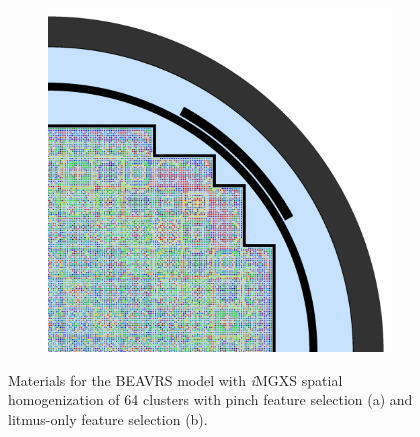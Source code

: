 \begin{figure}[h!]
\begin{subfigure}{0.67\textwidth}
  \includegraphics[width=\linewidth]{figures/unsupervised/geometries/with-features/64-clusters/combined/full-core}
  \caption{}
  \label{fig:chap10-full-core-combined-64}
\end{subfigure}
\caption[Materials for BEAVRS with \textit{i}\ac{MGXS} homogenization (64 clusters)]{Materials for the \ac{BEAVRS} model with \textit{i}\ac{MGXS} spatial homogenization of 64 clusters with pinch feature selection (a) and litmus-only feature selection (b).}
\label{fig:chap10-full-core-geometries-64}
\end{figure}

\clearpage

